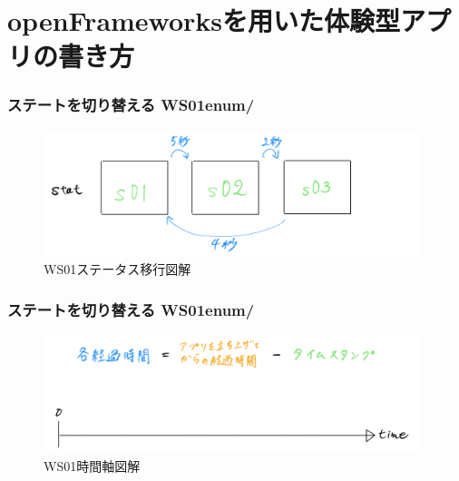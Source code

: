 \documentclass[10pt, dvipdfmx]{beamer}
\begin{document}
        \begin{frame}
        \end{frame}

        \begin{frame}
        \end{frame}

    \section{openFrameworksを用いた体験型アプリの書き方}
        \begin{frame}
            \frametitle{ステートを切り替える WS01enum/}
            \begin{figure}[htb]
                 \includegraphics[width=110mm]{images/ws01-1.png}
                 \caption{WS01ステータス移行図解}
                \label{fig:11}
            \end{figure}
        \end{frame}

        \begin{frame}
            \frametitle{ステートを切り替える WS01enum/}
            \begin{figure}[htb]
                 \includegraphics[width=110mm]{images/ws01-2.png}
                 \caption{WS01時間軸図解}
                \label{fig:12}
            \end{figure}
        \end{frame}
\end{document}
